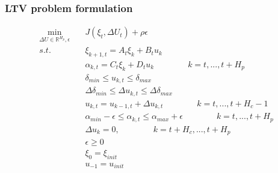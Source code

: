 \documentclass{beamer}
\begin{document}
\begin{frame}
\frametitle{LTV problem formulation }

\begin{align*}
\min_{\Delta U \in \mathbb{R}^{H_p}, \epsilon} \quad &J(\xi_t, \Delta U_t) +
\rho \epsilon \\
s.t. \qquad &\xi_{k+1,t} = A_t \xi_k + B_t u_k \\
&\alpha_{k,t} = C_t \xi_k + D_t u_k \qquad \qquad k = t, . . . , t + H_p \\
&\delta_{min} \leq u_{k,t} \leq \delta_{max} \\ 
&\Delta \delta_{min} \leq \Delta u_{k,t} \leq \Delta \delta_{max} \\
&u_{k,t} = u_{k-1,t} + \Delta u_{k,t} \qquad \qquad k = t, . . ., t + H_c - 1 \\
&\alpha_{min} - \epsilon \leq \alpha_{k,t} \leq \alpha_{max} + \epsilon \qquad
\qquad k = t, . . ., t + H_p\\
&\Delta u_k = 0, \qquad \qquad k = t + H_c, . . . , t + H_p \\
&\epsilon \geq 0 \\
&\xi_0 = \xi_{init} \\
& u_{-1} = u_{init}
\end{align*}

\end{frame}
\end{document}
